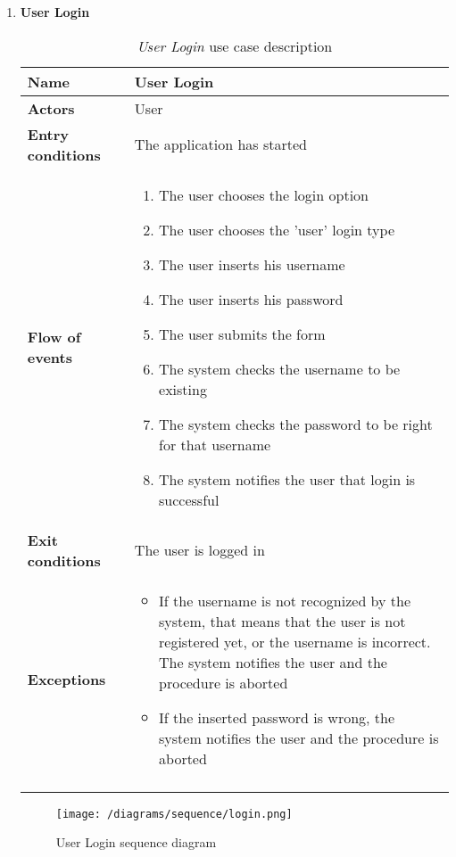 \begin{enumerate}
				\FloatBarrier
			\item \textbf{User Login}
				\begin{longtable}{p{0.25\linewidth}p{0.75\linewidth}}
					\toprule
					\textbf{Name} & \textbf{User Login} \\
					\midrule
					\textbf{Actors} & User \\
					\midrule
					\textbf{Entry conditions} & The application has started \\
					\midrule
					\textbf{Flow of events} & 
					\begin{enumerate}
						\item The user chooses the login option
						\item The user chooses the 'user' login type
						\item The user inserts his username
						\item The user inserts his password
						\item The user submits the form
						\item The system checks the username to be existing
						\item The system checks the password to be right for that username
						\item The system notifies the user that login is successful
					\end{enumerate} \\
					\midrule
					\textbf{Exit conditions} & The user is logged in\\
					\midrule
					\textbf{Exceptions} & 
					\begin{itemize}
						\item If the username is not recognized by the system, that means that the user is not registered yet, or the username is incorrect. The system notifies the user and the procedure is aborted
						\item If the inserted password is wrong, the system notifies the user and the procedure is aborted			
					\end{itemize} \\
					\bottomrule
					\caption{\emph{User Login} use case description}
				\end{longtable}
			
				\begin{figure}[h]
					\centering
					\texttt{[image: /diagrams/sequence/login.png]}
					\caption{User Login sequence diagram}
				\end{figure}
			

\end{enumerate}
